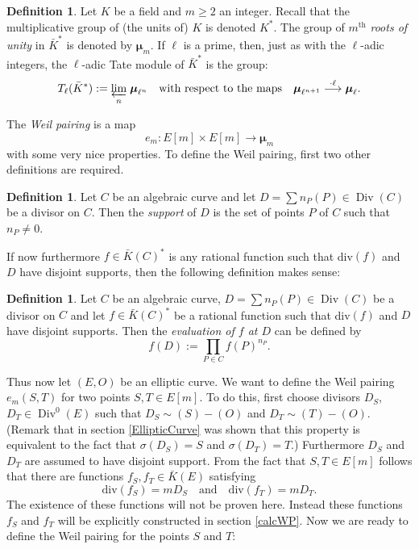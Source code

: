 \documentclass{article}
\numberwithin{equation}{section}
\theoremstyle{definition}
\newtheorem{definition}[theorem]{Definition}
\newcommand{\Div}{\operatorname{Div}} %
\newcommand{\invlim}[1]{\underset{#1}{\varprojlim}} %
\newcommand{\rou}[1]{\boldsymbol{\mu}_{#1}} %
\begin{document}
\begin{definition}\label{rou}
Let $K$ be a field and $m \geq 2$ an integer. Recall that the multiplicative group of (the units of) $K$ is denoted $K^*$. The group of $m^\text{th}$ \emph{roots of unity} in $\bar{K}^*$ is denoted by $\rou{m}$. If $\ell$ is a prime, then, just as with the $\ell$-adic integers, the $\ell$-adic Tate module of $\bar{K}^*$ is the group: $$T_\ell(\bar{K}^*):= \invlim{n} \; \rou{\ell^n} \quad \text{with respect to the maps} \quad \rou{\ell^{n+1}} \overset{\cdot \ell}{\longrightarrow} \rou{\ell}.$$
\end{definition}

The \emph{Weil pairing} is a map $$e_m: E[m] \times E[m] \rightarrow \rou{m}$$ with some very nice properties. To define the Weil pairing, first two other definitions are required.

\begin{definition}
Let $C$ be an algebraic curve and let $D=\sum n_P(P) \in \Div (C)$ be a divisor on $C$. Then the \emph{support} of $D$ is the set of points $P$ of $C$ such that $n_P \neq 0$. 
\end{definition}

If now furthermore $f\in \bar{K}(C)^*$ is any rational function such that div$(f)$ and $D$ have disjoint supports, then the following definition makes sense:

\begin{definition}
Let $C$ be an algebraic curve, $D=\sum n_P(P)\in\Div(C)$ be a divisor on $C$ and let $f \in \bar{K}(C)^*$ be a rational function such that div$(f)$ and $D$ have disjoint supports. Then the \emph{evaluation of $f$ at $D$} can be defined by $$f(D):=\prod_{P \in C} f(P)^{n_P}.$$ 
\end{definition}

Thus now let $(E,O)$ be an elliptic curve. We want to define the Weil pairing $e_m(S,T)$ for two points $S,T \in E[m]$. To do this, first choose divisors $D_S$, $D_T \in \Div^0(E)$ such that $D_S \sim (S)-(O)$ and $D_T \sim (T)-(O)$. (Remark that in section \ref{EllipticCurve} was shown that this property is equivalent to the fact that $\sigma(D_S) = S$ and $\sigma(D_T)=T$.) Furthermore $D_S$ and $D_T$ are assumed to have disjoint support. From the fact that $S,T \in E[m]$ follows that there are functions $f_S,f_T \in \bar{K}(E)$ satisfying $$\text{div}(f_S)=mD_S \quad \text{and} \quad \text{div}(f_T)=mD_T.$$ The existence of these functions will not be proven here. Instead these functions $f_S$ and $f_T$ will be explicitly constructed in section \ref{calcWP}. Now we are ready to define the Weil pairing for the points $S$ and $T$:
\end{document}
